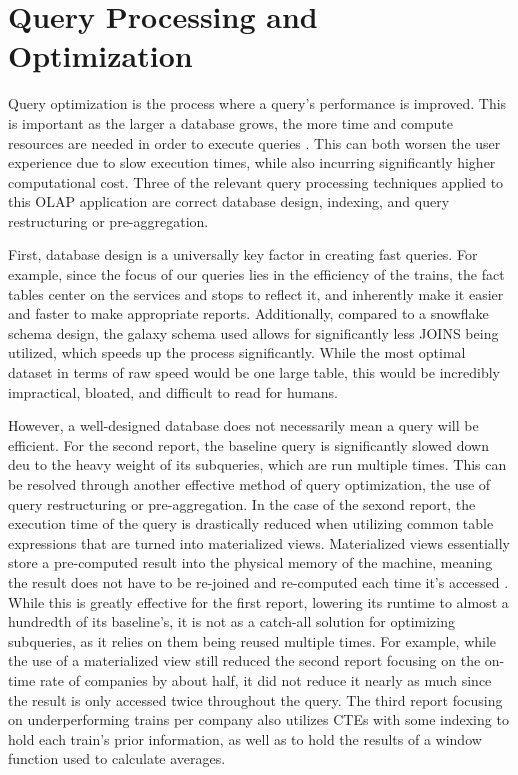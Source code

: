 \section{Query Processing and Optimization}
\label{sec:qpo}

Query optimization is the process where a query's performance is improved. This is important as the larger a database grows, the more 
time and compute resources are needed in order to execute queries \cite{ibm-query-optimizaiton}. This can both worsen the user experience due to slow execution times, 
while also incurring significantly higher computational cost. Three of the relevant query processing techniques applied to this OLAP 
application are correct database design, indexing, and query restructuring or pre-aggregation.


First, database design is a universally key factor in creating fast queries. For example, since the focus of our queries lies in the efficiency of the 
trains, the fact tables center on the services and stops to reflect it, and inherently make it easier and faster to make appropriate reports. Additionally, 
compared to a snowflake schema design, the galaxy schema used allows for significantly less JOINS being utilized, which speeds up the process significantly. 
While the most optimal dataset in terms of raw speed would  be one large table, this would be incredibly impractical, bloated, and difficult to read for humans. 

However, a well-designed database does not necessarily mean a query will be efficient. For the second report, the baseline query is 
significantly slowed down deu to the heavy weight of its subqueries, which are run multiple times. This can be resolved through another effective method 
of query optimization, the use of query restructuring or pre-aggregation. In the case of the sexond report, the execution time of the query is drastically
reduced when utilizing common table expressions that are turned into materialized views. Materialized views essentially store a pre-computed result into 
the physical memory of the machine, meaning the result does not have to be re-joined and re-computed each time it's accessed \cite{datacamp-optimization}. While this is greatly effective 
for the first report, lowering its runtime to almost a hundredth of its baseline's, it is not as a catch-all solution for optimizing subqueries, as it relies on 
them being reused multiple times. For example, while the use of a materialized view still reduced  the second report focusing on the on-time rate of 
companies by about half, it did not reduce it nearly as much since the result is only accessed twice throughout the query. The third report focusing on underperforming 
trains per company also utilizes CTEs with some indexing to hold each train's prior information, as well as to hold the results of a window function used to 
calculate averages.

